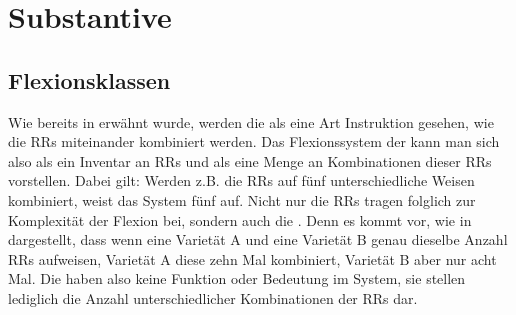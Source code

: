 \section{Substantive}\label{5.1}

\subsection{Flexionsklassen}\label{5.1.1}\label{5.1.1.}

Wie bereits in  erwähnt wurde, werden die  als eine Art Instruktion gesehen, wie die RRs miteinander kombiniert werden. Das Flexionssystem der  kann man sich also als ein Inventar an RRs und als eine Menge an Kombinationen dieser RRs vorstellen. Dabei gilt: Werden z.B. die RRs auf fünf unterschiedliche Weisen kombiniert, weist das System fünf  auf. Nicht nur die RRs tragen folglich zur Komplexität der Flexion bei, sondern auch die . Denn es kommt vor, wie in  dargestellt, dass wenn eine Varietät A und eine Varietät B genau dieselbe Anzahl RRs aufweisen, Varietät A diese zehn Mal kombiniert, Varietät B aber nur acht Mal. Die  haben also keine Funktion oder Bedeutung im System, sie stellen lediglich die Anzahl unterschiedlicher Kombinationen der RRs dar.

